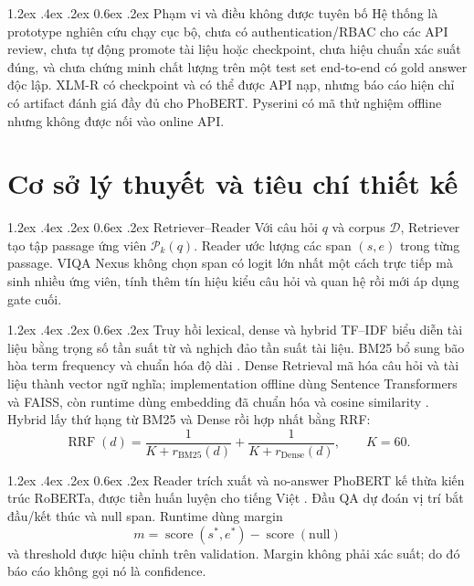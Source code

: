 \documentclass[12pt,a4paper,oneside]{report}
\makeatletter
\renewcommand\section{\@startsection {section}{1}{\z@}%
  {1.2ex \@plus .4ex \@minus .2ex}%
  {0.6ex \@plus .2ex}%
  {\normalfont\Large\bfseries}}
\makeatother
\begin{document}
\section{Phạm vi và điều không được tuyên bố}
Hệ thống là prototype nghiên cứu chạy cục bộ, chưa có authentication/RBAC cho các API
review, chưa tự động promote tài liệu hoặc checkpoint, chưa hiệu chuẩn xác suất đúng,
và chưa chứng minh chất lượng trên một test set end-to-end có gold answer độc lập.
XLM-R có checkpoint và có thể được API nạp, nhưng báo cáo hiện chỉ có artifact đánh
giá đầy đủ cho PhoBERT. Pyserini có mã thử nghiệm offline nhưng không được nối vào
online API.

\chapter{Cơ sở lý thuyết và tiêu chí thiết kế}
\label{chap:background}

\section{Retriever--Reader}
Với câu hỏi $q$ và corpus $\mathcal{D}$, Retriever tạo tập passage ứng viên
$\mathcal{P}_k(q)$. Reader ước lượng các span $(s,e)$ trong từng passage. VIQA Nexus
không chọn span có logit lớn nhất một cách trực tiếp mà sinh nhiều ứng viên, tính thêm
tín hiệu kiểu câu hỏi và quan hệ rồi mới áp dụng gate cuối.

\section{Truy hồi lexical, dense và hybrid}
TF--IDF biểu diễn tài liệu bằng trọng số tần suất từ và nghịch đảo tần suất tài liệu.
BM25 bổ sung bão hòa term frequency và chuẩn hóa độ dài \cite{robertson2009bm25}.
Dense Retrieval mã hóa câu hỏi và tài liệu thành vector ngữ nghĩa; implementation
offline dùng Sentence Transformers và FAISS, còn runtime dùng embedding đã chuẩn hóa
và cosine similarity \cite{reimers2019sbert}. Hybrid lấy thứ hạng từ BM25 và Dense
rồi hợp nhất bằng RRF:
\begin{equation}
  \operatorname{RRF}(d)=\frac{1}{K+r_{\mathrm{BM25}}(d)}+
  \frac{1}{K+r_{\mathrm{Dense}}(d)}, \qquad K=60.
\end{equation}

\section{Reader trích xuất và no-answer}
PhoBERT kế thừa kiến trúc RoBERTa, được tiền huấn luyện cho tiếng Việt
\cite{liu2019roberta,nguyen2020phobert}. Đầu QA dự đoán vị trí bắt đầu/kết thúc và
null span. Runtime dùng margin
\begin{equation}
  m = \operatorname{score}(s^*,e^*)-\operatorname{score}(\mathrm{null})
\end{equation}
và threshold được hiệu chỉnh trên validation. Margin không phải xác suất; do đó báo
cáo không gọi nó là confidence.
\end{document}
